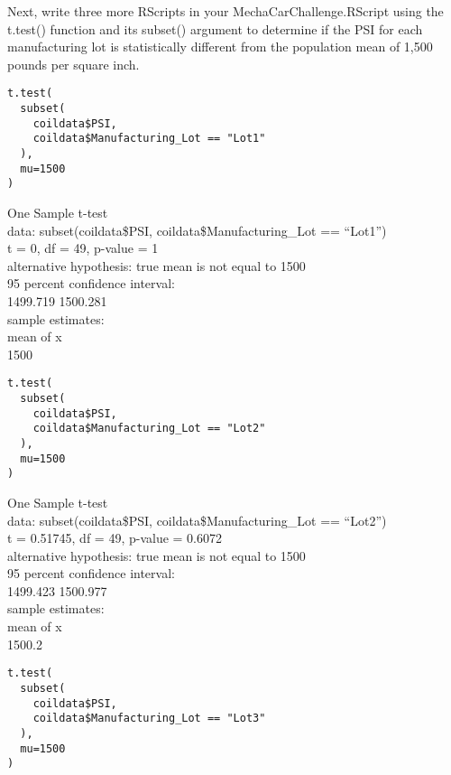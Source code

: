 \documentclass[11pt]{article}
\begin{document}
Next, write three more RScripts in your MechaCarChallenge.RScript using the t.test() function and its subset() argument to determine if the PSI for each manufacturing lot is statistically different from the population mean of 1,500 pounds per square inch.\\

\begin{verbatim}
t.test(
  subset(
    coildata$PSI,
    coildata$Manufacturing_Lot == "Lot1"
  ),
  mu=1500
)
\end{verbatim}

\begin{org}


One Sample t-test\\

data:  subset(coildata\$PSI, coildata\$Manufacturing\_Lot == ``Lot1'')\\
t = 0, df = 49, p-value = 1\\
alternative hypothesis: true mean is not equal to 1500\\
95 percent confidence interval:\\
 1499.719 1500.281\\
sample estimates:\\
mean of x\\
     1500\\
\end{org}

\begin{verbatim}
t.test(
  subset(
    coildata$PSI,
    coildata$Manufacturing_Lot == "Lot2"
  ),
  mu=1500
)
\end{verbatim}

\begin{org}


One Sample t-test\\

data:  subset(coildata\$PSI, coildata\$Manufacturing\_Lot == ``Lot2'')\\
t = 0.51745, df = 49, p-value = 0.6072\\
alternative hypothesis: true mean is not equal to 1500\\
95 percent confidence interval:\\
 1499.423 1500.977\\
sample estimates:\\
mean of x\\
   1500.2\\
\end{org}

\begin{verbatim}
t.test(
  subset(
    coildata$PSI,
    coildata$Manufacturing_Lot == "Lot3"
  ),
  mu=1500
)
\end{verbatim}
\end{document}
